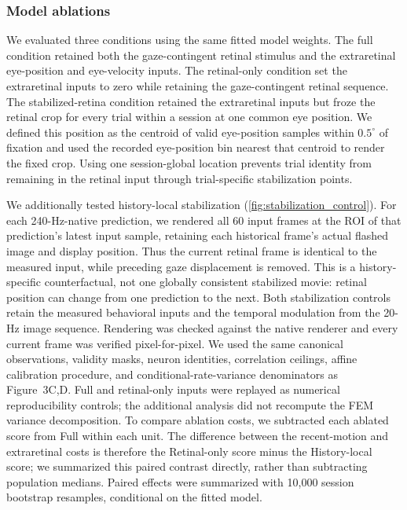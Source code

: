 \documentclass{lite}
\begin{document}
\subsubsection{Model ablations}
We evaluated three conditions using the same fitted model weights. The full condition retained both the gaze-contingent retinal stimulus and the extraretinal eye-position and eye-velocity inputs. The retinal-only condition set the extraretinal inputs to zero while retaining the gaze-contingent retinal sequence. The stabilized-retina condition retained the extraretinal inputs but froze the retinal crop for every trial within a session at one common eye position. We defined this position as the centroid of valid eye-position samples within $0.5^\circ$ of fixation and used the recorded eye-position bin nearest that centroid to render the fixed crop. Using one session-global location prevents trial identity from remaining in the retinal input through trial-specific stabilization points.

We additionally tested history-local stabilization (\ref{fig:stabilization_control}). For each  240-Hz-native prediction, we rendered all 60 input frames at the ROI of that prediction's latest input sample, retaining each historical frame's actual flashed image and display position. Thus the current retinal frame is identical to the measured input, while preceding gaze displacement is removed. This is a history-specific counterfactual, not one globally consistent stabilized movie: retinal position can change from one prediction to the next. Both stabilization controls retain the measured behavioral inputs and the temporal modulation from the 20-Hz image sequence. Rendering was checked against the native renderer and every current frame was verified pixel-for-pixel. We used the same canonical observations, validity masks, neuron identities, correlation ceilings, affine calibration procedure, and conditional-rate-variance denominators as Figure~3C,D. Full and retinal-only inputs were replayed as numerical reproducibility controls; the additional analysis did not recompute the FEM variance decomposition. To compare ablation costs, we subtracted each ablated score from Full within each unit. The difference between the recent-motion and extraretinal costs is therefore the Retinal-only score minus the History-local score; we summarized this paired contrast directly, rather than subtracting population medians. Paired effects were summarized with 10,000 session bootstrap resamples, conditional on the fitted model.
\end{document}
